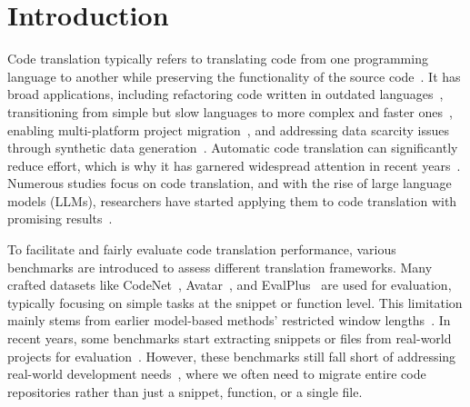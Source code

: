\section{Introduction}
Code translation typically refers to translating code from one programming language to another while preserving the functionality of the source code~\cite{pan2024lost,sun2024survey,eniser2024towards,dou2024s}. It has broad applications, including refactoring code written in outdated languages~\cite{aggarwal2015using}, transitioning from simple but slow languages to more complex and faster ones~\cite{szafraniec2022code}, enabling multi-platform project migration~\cite{nguyen2013lexical,nguyen2014migrating}, and addressing data scarcity issues through synthetic data generation~\cite{ren2020codebleu}. Automatic code translation can significantly reduce effort, which is why it has garnered widespread attention in recent years~\cite{bahdanau2014neural, chen2018tree, artetxe2018unsupervised, devlin2018bert, feng2020codebert, guo2020graphcodebert, ahmad2021unified, guo2022unixcoder, zheng2023codegeex}. Numerous studies focus on code translation, and with the rise of large language models (LLMs), researchers have started applying them to code translation with promising results~\cite{yang2024exploring,lano2024using,nitin2024spectra}. 

To facilitate and fairly evaluate code translation performance, various benchmarks are introduced to assess different translation frameworks. Many crafted datasets like CodeNet~\cite{puri2021codenet}, Avatar~\cite{ahmad2021avatar}, and EvalPlus~\cite{liu2024your} are used for evaluation, typically focusing on simple tasks at the snippet or function level. This limitation mainly stems from earlier model-based methods' restricted window lengths~\cite{feng2020codebert,guo2020graphcodebert,ahmad2021unified,guo2022unixcoder}. In recent years, some benchmarks start extracting snippets or files from real-world projects for evaluation~\cite{yan2023codescope,yan2023codetransocean}. However, these benchmarks still fall short of addressing real-world development needs~\cite{pan2024lost}, where we often need to migrate entire code repositories rather than just a snippet, function, or a single file. 

